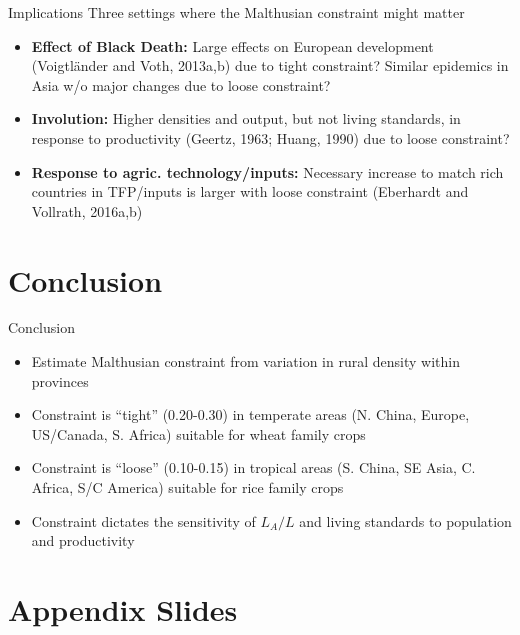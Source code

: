 \documentclass[10pt, xcolor=dvipsnames]{beamer}
\begin{document}
\begin{frame}{Implications}
Three settings where the Malthusian constraint might matter
\begin{itemize}
  \item \textbf{Effect of Black Death:} Large effects on European development (Voigtl{\"a}nder and Voth, 2013a,b) due to tight constraint? Similar epidemics in Asia w/o major changes due to loose constraint?
  \item \textbf{Involution:} Higher densities and output, but not living standards, in response to productivity (Geertz, 1963; Huang, 1990) due to loose constraint?
  \item \textbf{Response to agric. technology/inputs:} Necessary increase to match rich countries in TFP/inputs is larger with loose constraint (Eberhardt and Vollrath, 2016a,b)
\end{itemize}
\end{frame}

\section{Conclusion}

\begin{frame}{Conclusion}
\begin{itemize}
  \item Estimate Malthusian constraint from variation in rural density within provinces
  \item Constraint is ``tight'' (0.20-0.30) in temperate areas (N. China, Europe, US/Canada, S. Africa) suitable for wheat family crops
  \item Constraint is ``loose'' (0.10-0.15) in tropical areas (S. China, SE Asia, C. Africa, S/C America) suitable for rice family crops
  \item Constraint dictates the sensitivity of $L_A/L$ and living standards to population and productivity
\end{itemize}
\end{frame}

\section{Appendix Slides}
\appendix
\end{document}

